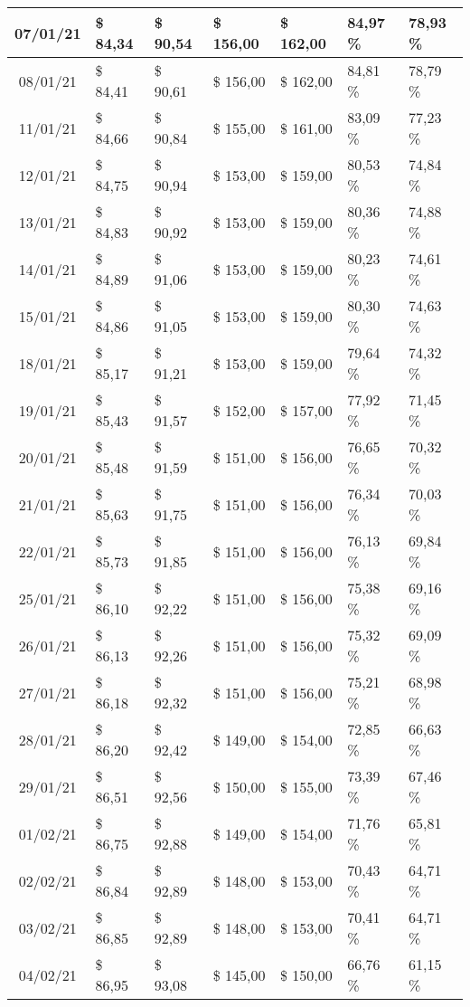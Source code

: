 \begin{center}
\begin{longtable}{|c|p{1.5cm}|p{1.5cm}|p{1.5cm}|p{1.5cm}|p{1.5cm}|p{1.5cm}|}
07/01/21 & \$ 84,34 & \$ 90,54 & \$ 156,00 & \$ 162,00 & 84,97 \% & 78,93 \% \\ \hline
08/01/21 & \$ 84,41 & \$ 90,61 & \$ 156,00 & \$ 162,00 & 84,81 \% & 78,79 \% \\ \hline
11/01/21 & \$ 84,66 & \$ 90,84 & \$ 155,00 & \$ 161,00 & 83,09 \% & 77,23 \% \\ \hline
12/01/21 & \$ 84,75 & \$ 90,94 & \$ 153,00 & \$ 159,00 & 80,53 \% & 74,84 \% \\ \hline
13/01/21 & \$ 84,83 & \$ 90,92 & \$ 153,00 & \$ 159,00 & 80,36 \% & 74,88 \% \\ \hline
14/01/21 & \$ 84,89 & \$ 91,06 & \$ 153,00 & \$ 159,00 & 80,23 \% & 74,61 \% \\ \hline
15/01/21 & \$ 84,86 & \$ 91,05 & \$ 153,00 & \$ 159,00 & 80,30 \% & 74,63 \% \\ \hline
18/01/21 & \$ 85,17 & \$ 91,21 & \$ 153,00 & \$ 159,00 & 79,64 \% & 74,32 \% \\ \hline
19/01/21 & \$ 85,43 & \$ 91,57 & \$ 152,00 & \$ 157,00 & 77,92 \% & 71,45 \% \\ \hline
20/01/21 & \$ 85,48 & \$ 91,59 & \$ 151,00 & \$ 156,00 & 76,65 \% & 70,32 \% \\ \hline
21/01/21 & \$ 85,63 & \$ 91,75 & \$ 151,00 & \$ 156,00 & 76,34 \% & 70,03 \% \\ \hline
22/01/21 & \$ 85,73 & \$ 91,85 & \$ 151,00 & \$ 156,00 & 76,13 \% & 69,84 \% \\ \hline
25/01/21 & \$ 86,10 & \$ 92,22 & \$ 151,00 & \$ 156,00 & 75,38 \% & 69,16 \% \\ \hline
26/01/21 & \$ 86,13 & \$ 92,26 & \$ 151,00 & \$ 156,00 & 75,32 \% & 69,09 \% \\ \hline
27/01/21 & \$ 86,18 & \$ 92,32 & \$ 151,00 & \$ 156,00 & 75,21 \% & 68,98 \% \\ \hline
28/01/21 & \$ 86,20 & \$ 92,42 & \$ 149,00 & \$ 154,00 & 72,85 \% & 66,63 \% \\ \hline
29/01/21 & \$ 86,51 & \$ 92,56 & \$ 150,00 & \$ 155,00 & 73,39 \% & 67,46 \% \\ \hline
01/02/21 & \$ 86,75 & \$ 92,88 & \$ 149,00 & \$ 154,00 & 71,76 \% & 65,81 \% \\ \hline
02/02/21 & \$ 86,84 & \$ 92,89 & \$ 148,00 & \$ 153,00 & 70,43 \% & 64,71 \% \\ \hline
03/02/21 & \$ 86,85 & \$ 92,89 & \$ 148,00 & \$ 153,00 & 70,41 \% & 64,71 \% \\ \hline
04/02/21 & \$ 86,95 & \$ 93,08 & \$ 145,00 & \$ 150,00 & 66,76 \% & 61,15 \% \\ \hline

\end{longtable}
\end{center}
